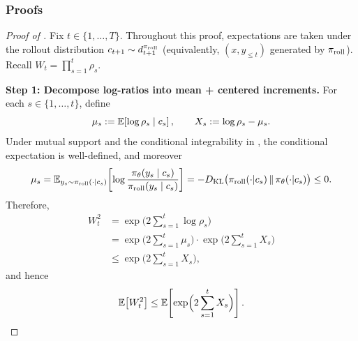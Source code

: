 \subsubsection{Proofs}

\begin{proof}[Proof of ]
Fix $t\in\{1,\ldots,T\}$. Throughout this proof, expectations are taken under the rollout distribution
$c_{t+1}\sim d_{t+1}^{\pi_{\mathrm{roll}}}$ (equivalently, $(x,y_{\le t})$ generated by $\pi_{\mathrm{roll}}$).
Recall $W_t=\prod_{s=1}^{t}\rho_s$.

\smallskip
\noindent\textbf{Step 1: Decompose log-ratios into mean + centered increments.}
For each $s\in\{1,\ldots,t\}$, define
\begin{equation*}
    \mu_s := \mathbb{E}\!\left[\log\rho_s\mid c_s\right],
    \qquad
    X_s := \log\rho_s - \mu_s.
\end{equation*}
Under mutual support and the conditional integrability in , the conditional expectation is well-defined, and moreover
\begin{equation*}
    \mu_s
    =
    \mathbb{E}_{y_s\sim \pi_{\mathrm{roll}}(\cdot|c_s)}\!\left[\log\frac{\pi_{\theta}(y_s\mid c_s)}{\pi_{\mathrm{roll}}(y_s\mid c_s)}\right]
    =
    -D_{\mathrm{KL}}\bigl(\pi_{\mathrm{roll}}(\cdot|c_s)\,\|\,\pi_{\theta}(\cdot|c_s)\bigr)
    \le 0.
\end{equation*}
Therefore,
\begin{align*}
    W_t^2
    &= \exp\!\Big(2\sum_{s=1}^{t}\log\rho_s\Big)
    \\
    &= \exp\!\Big(2\sum_{s=1}^{t}\mu_s\Big)\cdot \exp\!\Big(2\sum_{s=1}^{t}X_s\Big)
    \\
    &\le \exp\!\Big(2\sum_{s=1}^{t}X_s\Big),
\end{align*}
and hence
\begin{equation*}
    \mathbb{E}\!\left[W_t^2\right]
    \le
    \mathbb{E}\!\left[\exp\!\Big(2\sum_{s=1}^{t}X_s\Big)\right].
\end{equation*}


\end{proof}
